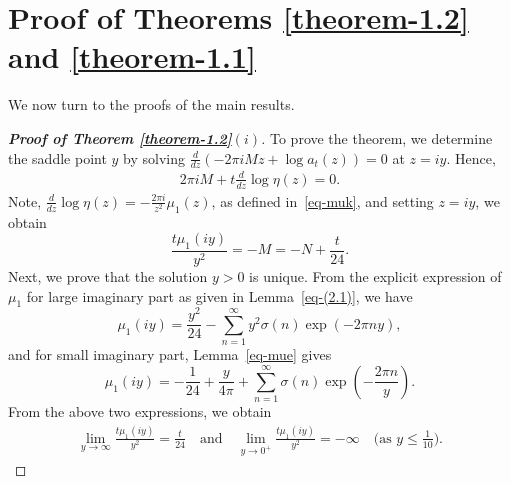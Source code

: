 \documentclass[11pt]{amsart}
\theoremstyle{plain}
\numberwithin{equation}{section}
\begin{document}
	\section{Proof of Theorems \ref{theorem-1.2} and \ref{theorem-1.1}}
	We now turn to the proofs of the main results. 
	\begin{proof}[\textbf{\boldmath Proof of Theorem \ref{theorem-1.2}$(i)$}]
		To prove the theorem, we determine the saddle point $y$ by solving $\frac{d}{dz}\left(-2\pi iMz+\log a_t(z)\right)=0$ at $z=iy.$ Hence,
		\begin{align*}%
			2\pi iM+t\frac{d}{dz}\log \eta(z)=0.  
		\end{align*}
		Note, $\frac{d}{dz}\log \eta(z)=-\frac{2\pi i}{z^{2}}\mu_1(z)$, as defined in~\eqref{eq-muk}, and setting $z=iy$, we obtain
		\begin{equation*}%
			\frac{t\mu_{1}(iy)}{y^{2}}=-M=-N+\frac{t}{24}.   
		\end{equation*}
		Next, we prove that the solution $y>0$ is unique. From the explicit expression of $\mu_1$ for large imaginary part as given in Lemma~\ref{eq-(2.1)}, we have 
		\begin{equation*}%
			\mu_{1}(iy)=\frac{y^{2}}{24}-\sum_{n=1}^{\infty}y^{2}\sigma(n)\exp(-2\pi ny), 
		\end{equation*} 
		and for small imaginary part, Lemma~\ref{eq-mue} gives
		\begin{equation}\label{eq-pf12}
			\mu_{1}(iy)=-\frac{1}{24}+\frac{y}{4\pi}+\sum_{n=1}^{\infty}\sigma(n)\exp\left(-\frac{2\pi n}{y}\right).
		\end{equation}
		From the above two expressions, we obtain 
		\begin{align*}
			\lim_{y\to\infty}\frac{t\mu_1(iy)}{y^{2}}=\frac{t}{24} \quad\text{and}\quad \lim_{y\to 0^{+}}\frac{t\mu_1(iy)}{y^{2}}=-\infty \quad\text{(as $y\le \frac{1}{10}$)}.

\end{align*}
\end{proof}
\end{document}
